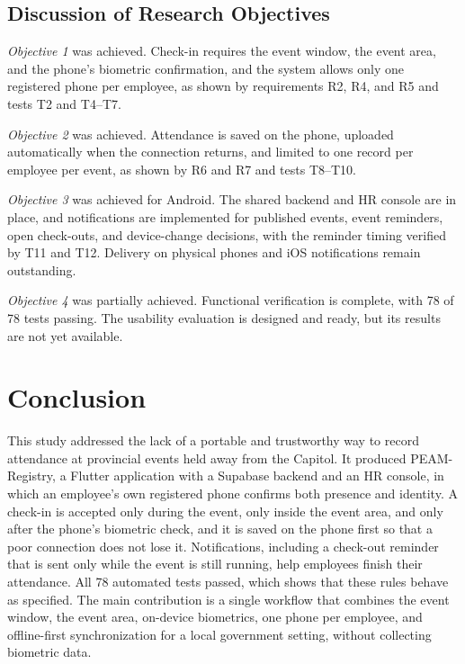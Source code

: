 \documentclass[conference]{IEEEtran}
\begin{document}
\subsection{Discussion of Research Objectives}

\textit{Objective 1} was achieved. Check-in requires the event window,
the event area, and the phone's biometric confirmation, and the system
allows only one registered phone per employee, as shown by
requirements R2, R4, and R5 and tests T2 and T4--T7.

\textit{Objective 2} was achieved. Attendance is saved on the phone,
uploaded automatically when the connection returns, and limited to one
record per employee per event, as shown by R6 and R7 and tests T8--T10.

\textit{Objective 3} was achieved for Android. The shared backend and
HR console are in place, and notifications are implemented for
published events, event reminders, open check-outs, and device-change
decisions, with the reminder timing verified by T11 and T12. Delivery
on physical phones and iOS notifications remain outstanding.

\textit{Objective 4} was partially achieved. Functional verification is
complete, with 78 of 78 tests passing. The usability evaluation is
designed and ready, but its results are not yet available.


\section{Conclusion}

This study addressed the lack of a portable and trustworthy way to
record attendance at provincial events held away from the Capitol. It
produced PEAM-Registry, a Flutter application with a Supabase backend and
an HR console, in which an employee's own registered phone confirms both
presence and identity. A check-in is accepted only during the event,
only inside the event area, and only after the phone's biometric
check, and it is saved on the phone first so that a poor connection
does not lose it. Notifications, including a check-out reminder that is
sent only while the event is still running, help employees finish their
attendance. All 78 automated tests passed, which shows that these rules
behave as specified. The main contribution is a single workflow that
combines the event window, the event area, on-device biometrics,
one phone per employee, and offline-first synchronization for a local
government setting, without collecting biometric data.
\end{document}
